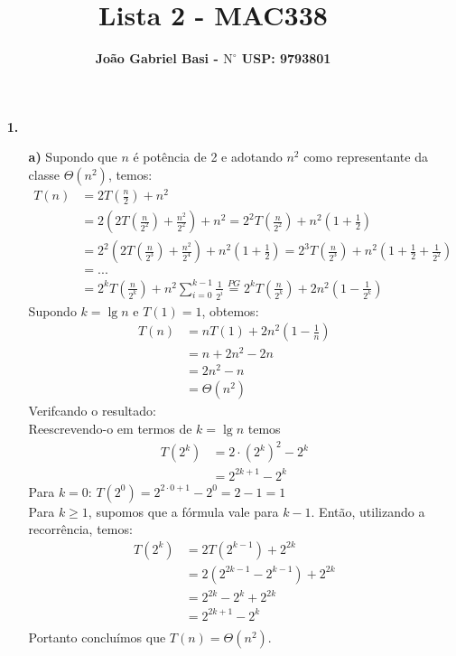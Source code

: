 \documentclass[12pt, a4paper]{article} %
\title{ \textbf{Lista 2 - MAC338}}
\date{}
\author{ \textbf{João Gabriel Basi - $\text{N}^\circ$ USP: 9793801}}
\begin{document}
\maketitle
\begin{enumerate}
\item[\textbf{1.}]
\begin{enumerate}
\item[\textbf{a)}]
Supondo que $n$ é potência de 2 e adotando $n^2$ como representante da classe
$\Theta(n^2)$, temos:
\begin{align*}
T(n) &= 2T\left(\frac{n}{2}\right) + n^2\\
     &= 2\left(2T\left(\frac{n}{2^2}\right) + \frac{n^2}{2^2}\right) + n^2 = 2^2T\left(\frac{n}{2^2}\right) + n^2\left(1 + \frac{1}{2}\right)\\
     &= 2^2\left(2T\left(\frac{n}{2^3}\right) + \frac{n^2}{2^4}\right) + n^2\left(1 + \frac{1}{2}\right) = 2^3T\left(\frac{n}{2^3}\right) + n^2\left(1 + \frac{1}{2} + \frac{1}{2^2}\right)\\
     &= ...\\
     &= 2^kT\left(\frac{n}{2^k}\right) + n^2\sum_{i=0}^{k-1}\frac{1}{2^i} \stackrel{PG}{=} 2^kT\left(\frac{n}{2^k}\right) + 2n^2\left(1-\frac{1}{2^k}\right)
\end{align*}
Supondo $k = \lg n$ e $T(1) = 1$, obtemos:
\begin{align*}
T(n) &= nT(1) + 2n^2\left(1-\frac{1}{n}\right)\\
     &= n + 2n^2 - 2n\\
     &= 2n^2 - n\\
     &= \Theta(n^2)
\end{align*}
Verifcando o resultado:\\
Reescrevendo-o em termos de $k = \lg n$ temos
\begin{align*}
T(2^k) &= 2\cdot (2^k)^2 - 2^k \\
       &= 2^{2k+1} - 2^k
\end{align*}
Para $k = 0$: $T(2^0) = 2^{2\cdot 0 + 1} - 2^0 = 2 - 1 = 1$\\
Para $k \geqslant 1$, supomos que a fórmula vale para $k - 1$. Então, utilizando
a recorrência, temos:
\begin{align*}
T(2^k) &= 2T(2^{k-1}) + 2^{2k} \\
       &= 2(2^{2k-1} - 2^{k-1}) + 2^{2k}\\
       &= 2^{2k} - 2^k + 2^{2k}\\
       &= 2^{2k+1} - 2^k\\
\end{align*}
Portanto concluímos que $T(n) = \Theta(n^2)$.


\end{enumerate}
\end{enumerate}
\end{document}
